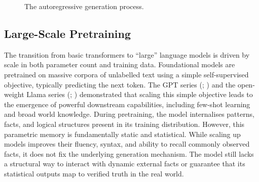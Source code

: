 \begin{figure}[H]
    \centering
    \caption{The autoregressive generation process.}
    \label{fig:autoregressive_generation}
\end{figure}

\subsection{Large-Scale Pretraining}

The transition from basic transformers to ``large'' language models is driven by scale in both parameter count and training data. Foundational models are pretrained on massive corpora of unlabelled text using a simple self-supervised objective, typically predicting the next token. The GPT series (\citealt{brown2020gpt3}; \citealt{achiam2023gpt4}) and the open-weight Llama series (\citealt{touvron2023llama}; \citealt{dubey2024llama3}) demonstrated that scaling this simple objective leads to the emergence of powerful downstream capabilities, including few-shot learning and broad world knowledge. During pretraining, the model internalises patterns, facts, and logical structures present in its training distribution. However, this parametric memory is fundamentally static and statistical. While scaling up models improves their fluency, syntax, and ability to recall commonly observed facts, it does not fix the underlying generation mechanism. The model still lacks a structural way to interact with dynamic external facts or guarantee that its statistical outputs map to verified truth in the real world.

